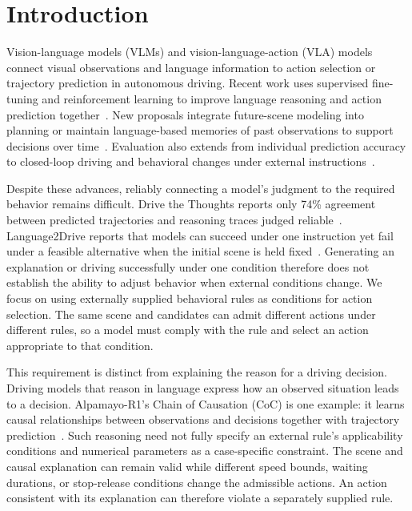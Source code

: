 \section{Introduction}\label{sec:introduction}

Vision-language models (VLMs) and vision-language-action (VLA) models connect
visual observations and language information to action selection or trajectory
prediction in autonomous driving. Recent work uses supervised fine-tuning and
reinforcement learning to improve language reasoning and action prediction
together~\cite{r1}. New proposals integrate future-scene modeling into planning
or maintain language-based memories of past observations to support decisions
over time~\cite{Wang2026DriveWLA,Yan2026ADMemo}. Evaluation also extends from
individual prediction accuracy to closed-loop driving and behavioral changes
under external instructions~\cite{Jia2026Bench2DriveVL,You2026Language2Drive}.

Despite these advances, reliably connecting a model's judgment to the required
behavior remains difficult. Drive the Thoughts reports only 74\% agreement between
predicted trajectories and reasoning traces judged
reliable~\cite{r18}. Language2Drive reports that models can succeed under one
instruction yet fail under a feasible alternative when the initial scene is
held fixed~\cite{You2026Language2Drive}. Generating an explanation or driving
successfully under one condition therefore does not establish the ability to
adjust behavior when external conditions change. We focus on using externally
supplied behavioral rules as conditions for action selection. The same scene
and candidates can admit different actions under different rules, so a model
must comply with the rule and select an action appropriate to that condition.

This requirement is distinct from explaining the reason for a driving
decision. Driving models that reason in language express how an observed
situation leads to a decision. Alpamayo-R1's Chain of Causation (CoC) is one
example: it learns causal relationships between observations and decisions
together with trajectory prediction~\cite{r1}. Such reasoning need not fully
specify an external rule's applicability conditions and numerical parameters
as a case-specific constraint. The scene and causal explanation can remain
valid while different speed bounds, waiting durations, or stop-release
conditions change the admissible actions. An action consistent with its
explanation can therefore violate a separately supplied rule.

